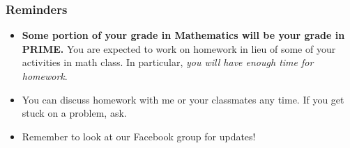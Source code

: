 \documentclass[10pt,paper=letter]{scrartcl}
\begin{document}
\subsubsection*{Reminders}

\begin{itemize}

\item \textbf{Some portion of your grade in Mathematics will be your grade in PRIME.} You are expected to work on homework in lieu of some of your activities in math class. In particular, \emph{you will have enough time for homework}. 

\item You can discuss homework with me or your classmates any time. If you get stuck on a problem, ask.

\item Remember to look at our Facebook group for updates!

\end{itemize}
\end{document}
